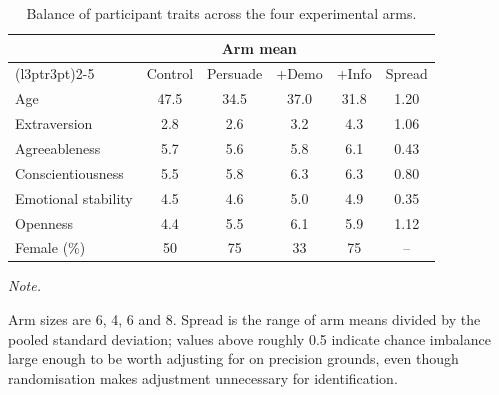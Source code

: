 \begin{table}[!h]
\centering
\caption{\label{tab:balance}Balance of participant traits across the four experimental arms.}
\centering
\fontsize{9}{11}\selectfont
\begin{threeparttable}
\begin{tabular}[t]{lccccc}
\toprule
\multicolumn{1}{c}{ } & \multicolumn{4}{c}{Arm mean} & \multicolumn{1}{c}{ } \\
\cmidrule(l{3pt}r{3pt}){2-5}
 & Control & Persuade & +Demo & +Info & Spread\\
\midrule
Age & 47.5 & 34.5 & 37.0 & 31.8 & 1.20\\
Extraversion & 2.8 & 2.6 & 3.2 & 4.3 & 1.06\\
Agreeableness & 5.7 & 5.6 & 5.8 & 6.1 & 0.43\\
Conscientiousness & 5.5 & 5.8 & 6.3 & 6.3 & 0.80\\
Emotional stability & 4.5 & 4.6 & 5.0 & 4.9 & 0.35\\
\addlinespace
Openness & 4.4 & 5.5 & 6.1 & 5.9 & 1.12\\
Female (\%) & 50 & 75 & 33 & 75 & --\\
\bottomrule
\end{tabular}
\begin{tablenotes}
\item \textit{Note.} 
\item Arm sizes are 6, 4, 6 and 8. Spread is the range of arm means divided by the pooled standard deviation; values above roughly 0.5 indicate chance imbalance large enough to be worth adjusting for on precision grounds, even though randomisation makes adjustment unnecessary for identification.
\end{tablenotes}
\end{threeparttable}
\end{table}
